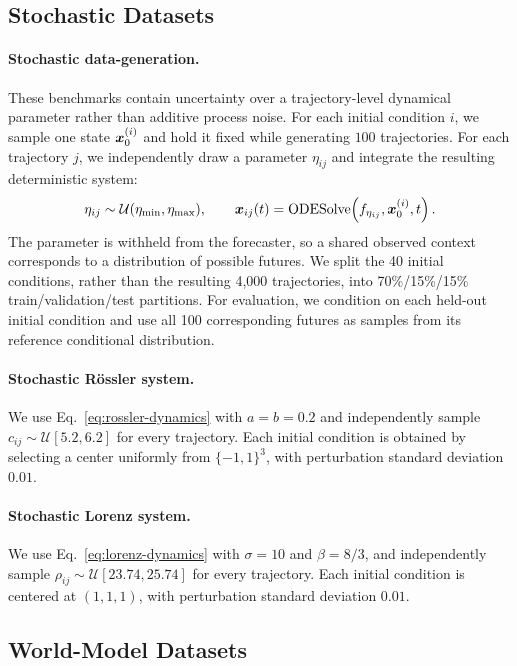 \subsection{Stochastic Datasets}
\label{sec:stochastic-datasets}

\paragraph{Stochastic data-generation.}
These benchmarks contain uncertainty over a trajectory-level dynamical
parameter rather than additive process noise.  For each initial condition
$i$, we sample one state ${\bm{x}}_0^{(i)}$ and hold it fixed while generating
$100$ trajectories.  For each trajectory $j$, we independently draw a
parameter $\eta_{ij}$ and integrate the resulting deterministic system:
\begin{equation}
  \eta_{ij}\sim\mathcal U(\eta_{\min},\eta_{\max}),\qquad
  {\bm{x}}_{ij}(t)
  =\operatorname{ODESolve}\!\left(f_{\eta_{ij}},{\bm{x}}_0^{(i)},t\right).
  \label{eq:stochastic-dataset-generation}
\end{equation}
The parameter is withheld from the forecaster, so a shared observed context
corresponds to a distribution of possible futures.  We split the 40 initial
conditions, rather than the resulting 4,000 trajectories, into 70\%/15\%/15\%
train/validation/test partitions.  For evaluation, we condition on each held-out initial condition and use all 100 corresponding futures as samples from its reference conditional distribution.

\paragraph{Stochastic R\"ossler system.}
We use Eq.~\ref{eq:rossler-dynamics} with $a=b=0.2$ and independently sample
$c_{ij}\sim\mathcal U[5.2,6.2]$ for every trajectory.  Each initial condition
is obtained by selecting a center uniformly from
$\{-1,1\}^3$, with perturbation standard deviation $0.01$.

\paragraph{Stochastic Lorenz system.}
We use Eq.~\ref{eq:lorenz-dynamics} with $\sigma=10$ and $\beta=8/3$, and
independently sample $\rho_{ij}\sim\mathcal U[23.74,25.74]$ for every
trajectory.  Each initial condition is centered at $(1,1,1)$, with
perturbation standard deviation $0.01$.

\subsection{World-Model Datasets}
\label{sec:world-model-datasets}

